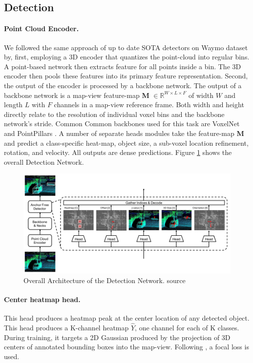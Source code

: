 \documentclass[10pt,twocolumn,letterpaper]{article}
\begin{document}
\subsection{Detection}

\paragraph{Point Cloud Encoder.} We followed the same approach of up to date SOTA detectors \cite{sota on waymo} on Waymo dataset\cite{dataset} by, first, employing a 3D encoder that quantizes the point-cloud into regular bins. A point-based network then extracts feature for all points inside a bin. The 3D encoder then pools these features into its primary feature representation. Second, the output of the encoder is processed by a backbone network. The output of a backbone network is a map-view feature-map  \textbf{M}  $ \in \mathbb{R}^{W \times L\times F}$ of width $W$ and length $L$ with $F$ channels in a map-view reference frame. Both width and height directly relate to the resolution of individual voxel bins and the backbone network’s stride. Common Common backbones used for this task are VoxelNet \cite{second, pixor} and PointPillars \cite{PointPillars}. A number of separate heads modules take the feature-map \textbf{M} and predict a class-specific heat-map, object size, a sub-voxel location refinement, rotation, and velocity. All outputs are dense predictions. Figure \ref{fig:detection_network} shows the overall Detection Network.

\begin{figure}
	\includegraphics[width=\linewidth]{media/detection_net.png}
   \caption{Overall Architecture of the Detection Network. source \cite{ge2020afdet}}
\label{fig:detection_network}
\end{figure}

\paragraph{Center heatmap head.}
This head produces a heatmap peak at the center location of any detected object. This head produces a K-channel heatmap $\hat{Y}$, one channel for each of K classes. During training, it targets a 2D Gaussian produced by the projection of 3D centers of annotated bounding boxes into the map-view. Following \cite{zhou2019objects}, a focal loss is used.
\end{document}
